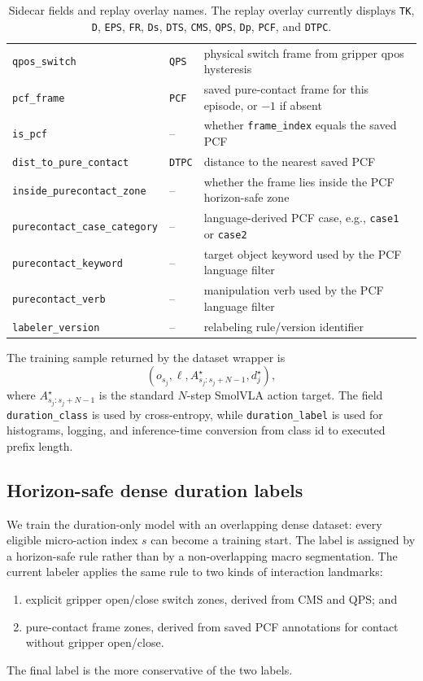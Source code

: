 \documentclass[10pt,twocolumn,letterpaper]{article}
\begin{document}
\begin{table}[t]
\begin{tabular}{@{}p{}p{}p{}@{}}
\texttt{qpos\_switch} & \texttt{QPS} & physical switch frame from gripper qpos hysteresis \\
\texttt{pcf\_frame} & \texttt{PCF} & saved pure-contact frame for this episode, or $-1$ if absent \\
\texttt{is\_pcf} & -- & whether \texttt{frame\_index} equals the saved PCF \\
\texttt{dist\_to\_pure\_contact} & \texttt{DTPC} & distance to the nearest saved PCF \\
\texttt{inside\_purecontact\_zone} & -- & whether the frame lies inside the PCF horizon-safe zone \\
\texttt{purecontact\_case\_category} & -- & language-derived PCF case, e.g., \texttt{case1} or \texttt{case2} \\
\texttt{purecontact\_keyword} & -- & target object keyword used by the PCF language filter \\
\texttt{purecontact\_verb} & -- & manipulation verb used by the PCF language filter \\
\texttt{labeler\_version} & -- & relabeling rule/version identifier \\
\bottomrule
\end{tabular}
\caption{Sidecar fields and replay overlay names. The replay overlay currently displays \texttt{TK}, \texttt{D}, \texttt{EPS}, \texttt{FR}, \texttt{Ds}, \texttt{DTS}, \texttt{CMS}, \texttt{QPS}, \texttt{Dp}, \texttt{PCF}, and \texttt{DTPC}.}
\label{tab:hiva-lite-sidecar-fields}
\end{table}
The training sample returned by the dataset wrapper is
\begin{equation}
(o_{s_j},\ell,A^{\star}_{s_j:s_j+N-1},d_j^{\star}),
\end{equation}
where $A^{\star}_{s_j:s_j+N-1}$ is the standard $N$-step SmolVLA action target. The field \texttt{duration\_class} is used by cross-entropy, while \texttt{duration\_label} is used for histograms, logging, and inference-time conversion from class id to executed prefix length.

\subsection{Horizon-safe dense duration labels}
\label{app:horizon-safe-labeling}
We train the duration-only model with an overlapping dense dataset: every eligible micro-action index $s$ can become a training start. The label is assigned by a horizon-safe rule rather than by a non-overlapping macro segmentation. The current labeler applies the same rule to two kinds of interaction landmarks:
\begin{enumerate}
    \item explicit gripper open/close switch zones, derived from CMS and QPS; and
    \item pure-contact frame zones, derived from saved PCF annotations for contact without gripper open/close.
\end{enumerate}
The final label is the more conservative of the two labels.
\end{document}
